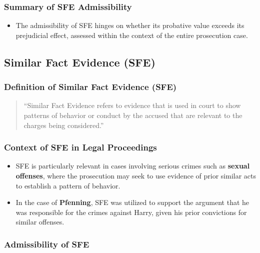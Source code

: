 \subsubsection{Summary of SFE
Admissibility}\label{summary-of-sfe-admissibility}

\begin{itemize}
\tightlist
\item
  The admissibility of SFE hinges on whether its probative value exceeds
  its prejudicial effect, assessed within the context of the entire
  prosecution case.
\end{itemize}

\subsection{  Similar Fact Evidence
(SFE)}\label{similar-fact-evidence-sfe}

\subsubsection{Definition of Similar Fact Evidence
(SFE)}\label{definition-of-similar-fact-evidence-sfe}

\begin{quote}
``Similar Fact Evidence refers to evidence that is used in court to show
patterns of behavior or conduct by the accused that are relevant to the
charges being considered.''
\end{quote}

\subsubsection{Context of SFE in Legal
Proceedings}\label{context-of-sfe-in-legal-proceedings}

\begin{itemize}
\tightlist
\item
  SFE is particularly relevant in cases involving serious crimes such as
  \textbf{sexual offenses}, where the prosecution may seek to use
  evidence of prior similar acts to establish a pattern of behavior.
\item
  In the case of \textbf{Pfenning}, SFE was utilized to support the
  argument that he was responsible for the crimes against Harry, given
  his prior convictions for similar offenses.
\end{itemize}

\subsubsection{Admissibility of SFE}\label{admissibility-of-sfe}

